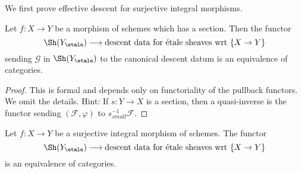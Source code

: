 \medskip\noindent
We first prove effective descent for surjective integral morphisms.

\begin{lemma}
\label{lemma-glue-etale-sheaf-section}
Let $f : X \to Y$ be a morphism of schemes which has a section. Then the
functor
$$
\Sh(Y_\etale)
\longrightarrow
\text{descent data for \'etale sheaves wrt }\{X \to Y\}
$$
sending $\mathcal{G}$ in $\Sh(Y_\etale)$ to the canonical descent datum
is an equivalence of categories.
\end{lemma}

\begin{proof}
This is formal and depends only on functoriality of the pullback
functors. We omit the details. Hint: If $s : Y \to X$ is a section,
then a quasi-inverse is the functor sending $(\mathcal{F}, \varphi)$
to $s_{small}^{-1}\mathcal{F}$.
\end{proof}

\begin{lemma}
\label{lemma-glue-etale-sheaf-integral-surjective}
Let $f : X \to Y$ be a surjective integral morphism of schemes.
The functor
$$
\Sh(Y_\etale)
\longrightarrow
\text{descent data for \'etale sheaves wrt }\{X \to Y\}
$$
is an equivalence of categories.
\end{lemma}

